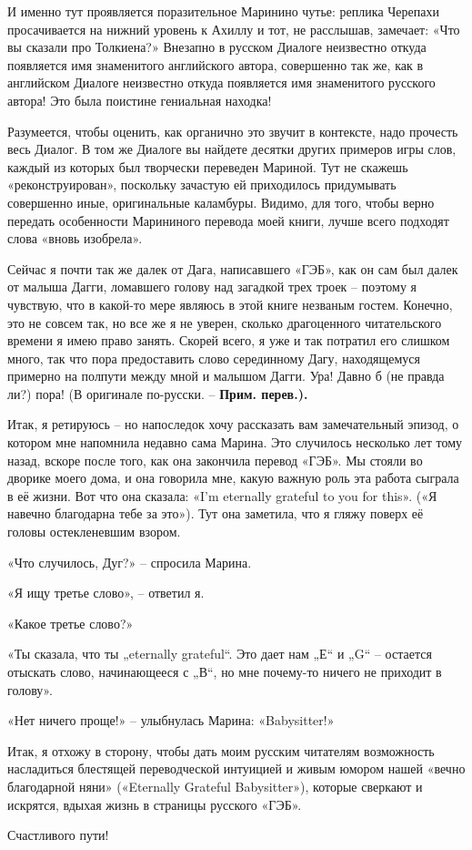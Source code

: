 \documentclass[../main.tex]{subfiles}
\begin{document}
И именно тут проявляется поразительное Маринино чутье: реплика Черепахи просачивается на нижний уровень к Ахиллу и тот, не расслышав, замечает: «Что вы сказали про Толкиена?» Внезапно в русском Диалоге неизвестно откуда появляется имя знаменитого английского автора, совершенно так же, как в английском Диалоге неизвестно откуда появляется имя знаменитого русского автора!
Это была поистине гениальная находка!

Разумеется, чтобы оценить, как органично это звучит в контексте, надо прочесть весь Диалог.
В том же Диалоге вы найдете десятки других примеров игры слов, каждый из которых был творчески переведен Мариной.
Тут не скажешь «реконструирован», поскольку зачастую ей приходилось придумывать совершенно иные, оригинальные каламбуры.
Видимо, для того, чтобы верно передать особенности Марининого перевода моей книги, лучше всего подходят слова «вновь изобрела».

Сейчас я почти так же далек от Дага, написавшего «ГЭБ», как он сам был далек от малыша Дагги, ломавшего голову над загадкой трех троек \--- поэтому я чувствую, что в какой-то мере являюсь в этой книге незваным гостем.
Конечно, это не совсем так, но все же я не уверен, сколько драгоценного читательского времени я имею право занять.
Скорей всего, я уже и так потратил его слишком много, так что пора предоставить слово серединному Дагу, находящемуся примерно на полпути между мной и малышом Дагги.
Ура!
Давно б (не правда ли?) пора! (В оригинале по-русски. \--- \textbf{Прим.
перев.).}

Итак, я ретируюсь \--- но напоследок хочу рассказать вам замечательный эпизод, о котором мне напомнила недавно сама Марина.
Это случилось несколько лет тому назад, вскоре после того, как она закончила перевод «ГЭБ».
Мы стояли во дворике моего дома, и она говорила мне, какую важную роль эта работа сыграла в её жизни.
Вот что она сказала: «I'm eternally grateful to you for this». («Я навечно благодарна тебе за это»).
Тут она заметила, что я гляжу поверх её головы остекленевшим взором.

«Что случилось, Дуг?» \--- спросила Марина.

«Я ищу третье слово», \--- ответил я.

«Какое третье слово?»

«Ты сказала, что ты „eternally grateful``.
Это дает нам „Е`` и „G`` \--- остается отыскать слово, начинающееся с „В``, но мне почему-то ничего не приходит в голову».

«Нет ничего проще!» \--- улыбнулась Марина: «Babysitter!»

Итак, я отхожу в сторону, чтобы дать моим русским читателям возможность насладиться блестящей переводческой интуицией и живым юмором нашей «вечно благодарной няни» («Eternally Grateful Babysitter»), которые сверкают и искрятся, вдыхая жизнь в страницы русского «ГЭБ».

\null

Счастливого пути!
\end{document}
